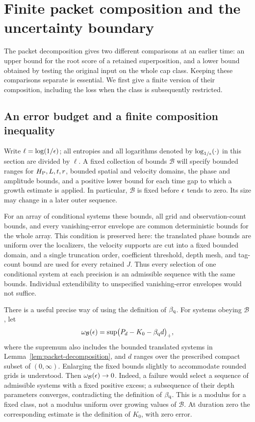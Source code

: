 \section{Finite packet composition and the uncertainty boundary}
\label{sec:packet-composition}

The packet decomposition gives two different comparisons at an earlier
time: an upper bound for the root score of a retained superposition, and
a lower bound obtained by testing the original input on the whole cap
class.  Keeping these comparisons separate is essential.  We first give
a finite version of their composition, including the loss when the class
is subsequently restricted.

\subsection{An error budget and a finite composition inequality}

Write $\ell=\log(1/\epsilon)$; all entropies and all logarithms denoted by
$\log_{1/\epsilon}\!\left(\cdot\right)$ in this section are divided by $\ell$.
A fixed collection of bounds $\mathcal B$ will specify bounded ranges
for $H_{\mathrm P},L,t,r$, bounded spatial and velocity domains, the phase and
amplitude bounds, and a positive lower bound for each time gap to which
a growth estimate is applied.  In particular, $\mathcal B$ is fixed
before $\epsilon$ tends to zero.  Its size may change in a later outer
sequence.

For an array of conditional systems these bounds, all grid and
observation-count bounds, and every vanishing-error envelope are
common deterministic bounds for the whole array.  This condition is
preserved here: the translated phase bounds are uniform over the
localizers, the velocity supports are cut into a fixed bounded domain,
and a single truncation order, coefficient threshold, depth mesh, and
tag-count bound are used for every retained $J$.  Thus every selection
of one conditional system at each precision is an admissible sequence
with the same bounds.  Individual extendibility to unspecified
vanishing-error envelopes would not suffice.

There is a useful precise way of using the definition of $\beta_{\mathrm q}$.
For systems obeying $\mathcal B$, let
\begin{equation}\label{eq:packet-universal-modulus}
 \omega_{\mathcal B}(\epsilon)
 =\sup\bigl(P_d-K_0-\beta_{\mathrm q} d\bigr)_+,
\end{equation}
where the supremum also includes the bounded translated systems in
Lemma~\ref{lem:packet-decomposition}, and $d$ ranges over the prescribed
compact subset of $(0,\infty)$.  Enlarging the fixed bounds slightly to
accommodate rounded grids is understood.  Then
$\omega_{\mathcal B}(\epsilon)\to0$.  Indeed, a failure would select a
sequence of admissible systems with a fixed positive excess; a
subsequence of their depth parameters converges, contradicting the
definition of $\beta_{\mathrm q}$.  This is a modulus for a fixed class, not a
modulus uniform over growing values of $\mathcal B$.  At duration zero
the corresponding estimate is the definition of $K_0$, with zero error.

